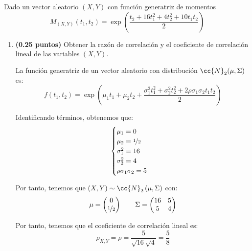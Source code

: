 \documentclass[12pt]{article}
\begin{document}
    \begin{ejercicio}[1 puntos]
        Dado un vector aleatorio $(X,Y)$ con función generatriz de momentos
        \begin{equation*}
            M_{(X,Y)}(t_1,t_2) = \exp\left(\dfrac{t_2+16t_1^2 + 4t_2^2 + 10t_1t_2}{2}\right)
        \end{equation*}
        \begin{enumerate}
            \item \textbf{(0.25 puntos)} Obtener la razón de correlación y el coeficiente de correlación lineal de las variables $(X,Y)$.
            
            La función generatriz de un vector aleatorio con distribución $\cc{N}_2(\mu,\Sigma)$ es:
            \begin{equation*}
                f(t_1,t_2) = \exp\left(\mu_1t_1+\mu_2t_2+\dfrac{\sigma_1^2t_1^2+\sigma_2^2t_2^2+2\rho\sigma_1\sigma_2t_1t_2}{2}\right)
            \end{equation*}

            Identificando términos, obtenemos que:
            \begin{equation*}
                \begin{cases}
                    \mu_1 = 0 \\
                    \mu_2 = \nicefrac{1}{2} \\
                    \sigma_1^2 = 16 \\
                    \sigma_2^2 = 4 \\
                    \rho\sigma_1\sigma_2 = 5
                \end{cases}
            \end{equation*}

            Por tanto, tenemos que $(X,Y)\sim \cc{N}_2\left(\mu,\Sigma\right)$ con:
            \begin{equation*}
                \mu = \begin{pmatrix}
                    0 \\ \nicefrac{1}{2}
                \end{pmatrix} \qquad \Sigma = \begin{pmatrix}
                    16 & 5 \\ 5 & 4
                \end{pmatrix}
            \end{equation*}

            Por tanto, tenemos que el coeficiente de correlación lineal es:
            \begin{equation*}
                \rho_{X,Y}=\rho=\dfrac{5}{\sqrt{16}\sqrt{4}} = \dfrac{5}{8}
            \end{equation*}


\end{enumerate}
\end{ejercicio}
\end{document}
